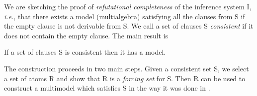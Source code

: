 %
%
%
We are sketching the proof of {\em refutational completeness} of the inference system
\C I, {\em i.e.}, that there exists a model (multialgebra) satisfying all the
clauses from \C S if the empty clause is not derivable from \C S.  We call a
set of clauses \C S {\em consistent} if it does not contain the empty clause.
The main result is

\begin{theorem}\label{completeness}
If a set of clauses \C S is consistent then it has a model.
\end{theorem}
\noindent
The construction proceeds in two main steps. Given a consistent set \C S,
we select a set of atoms \C R %
and show that \C R is a {\em forcing set}\/ for \C S.
Then %
\C R can be used to construct a multimodel which satisfies \C S in the
way it was done in \cite{KW}. 


